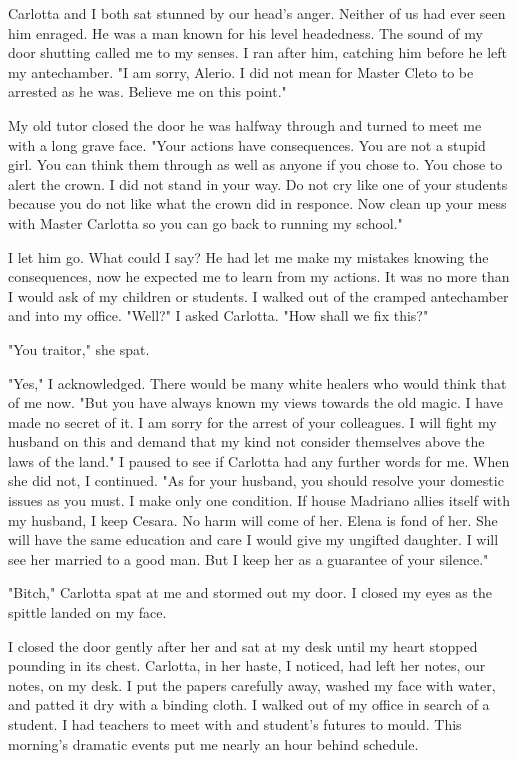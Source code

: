 \documentclass{article}
\begin{document}
Carlotta and I both sat stunned by our head's anger. Neither of us had ever seen him enraged. He was a man known for his level headedness. The sound of my door shutting called me to my senses. I ran after him, catching him before he left my antechamber. "I am sorry, Alerio. I did not mean for Master Cleto to be arrested as he was. Believe me on this point."

My old tutor closed the door he was halfway through and turned to meet me with a long grave face. "Your actions have consequences. You are not a stupid girl. You can think them through as well as anyone if you chose to. You chose to alert the crown. I did not stand in your way. Do not cry like one of your students because you do not like what the crown did in responce. Now clean up your mess with Master Carlotta so you can go back to running my school."

I let him go. What could I say? He had let me make my mistakes knowing the consequences, now he expected me to learn from my actions. It was no more than I would ask of my children or students. I walked out of the cramped antechamber and into my office. "Well?" I asked Carlotta. "How shall we fix this?"

"You traitor," she spat.

"Yes," I acknowledged. There would be many white healers who would think that of me now. "But you have always known my views towards the old magic. I have made no secret of it. I am sorry for the arrest of your colleagues. I will fight my husband on this and demand that my kind not consider themselves above the laws of the land." I paused to see if Carlotta had any further words for me. When she did not, I continued. "As for your husband, you should resolve your domestic issues as you must. I make only one condition. If house Madriano allies itself with my husband, I keep Cesara. No harm will come of her. Elena is fond of her. She will have the same education and care I would give my ungifted daughter. I will see her married to a good man. But I keep her as a guarantee of your silence."

"Bitch," Carlotta spat at me and stormed out my door. I closed my eyes as the spittle landed on my face. 

I closed the door gently after her and sat at my desk until my heart stopped pounding in its chest. Carlotta, in her haste, I noticed, had left her notes, our notes, on my desk. I put the papers carefully away, washed my face with water, and patted it dry with a binding cloth. I walked out of my office in search of a student. I had teachers to meet with and student's futures to mould. This morning's dramatic events put me nearly an hour behind schedule.
\end{document}
